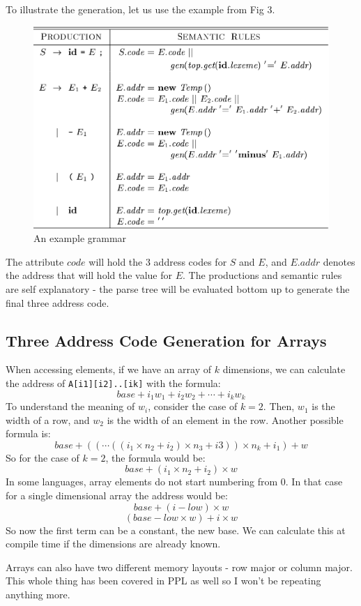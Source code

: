 \documentclass[12pt,letterpaper]{book}
\theoremstyle{definition}
\begin{document}
To illustrate the generation, let us use the example from Fig 3.

\begin{figure}[htpb]
  \centering
  \includegraphics[width=0.8\linewidth]{./assets/sdd_gen_eg.png}
  \caption{An example grammar}%
  \label{fig:}
\end{figure}

The attribute $code$ will hold the 3 address codes for $S$ and $E$, and $E.addr$ denotes the address that will hold the value for $E$. The productions and semantic rules are self explanatory - the parse tree will be evaluated bottom up to generate the final three address code.

\subsection{Three Address Code Generation for Arrays}

When accessing elements, if we have an array of $k$ dimensions, we can calculate the address of \texttt{A[i1][i2]..[ik]} with the formula:
\[base + i_1w_1 + i_2w_2 + \cdots + i_kw_k\]
To understand the meaning of $w_i$, consider the case of $k = 2$. Then, $w_1$ is the width of a row, and $w_2$ is the width of an element in the row. Another possible formula is:
\[base + (( \cdots ((i_1 \times n_2 + i_2) \times n_3 + i3)) \times n_k + i_1) + w\]
So for the case of $k=2$, the formula would be:
\[base + (i_1 \times n_2 + i_2) \times w\]
In some languages, array elements do not start numbering from 0. In that case for a single dimensional array the address would be:
\[base + (i-low)\times w\]
\[(base - low \times w) + i \times w\]
So now the first term can be a constant, the new base. We can calculate this at compile time if the dimensions are already known.

Arrays can also have two different memory layouts - row major or column major. This whole thing has been covered in PPL as well so I won't be repeating anything more.
\end{document}
